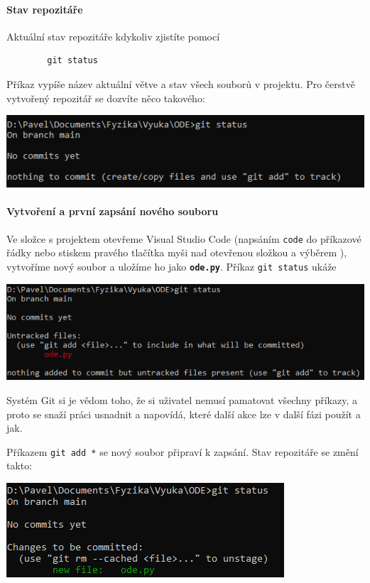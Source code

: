 \documentclass[a4paper,11pt,twoside]{article}
\newcommand{\subsubsubsection}[1]{\paragraph{#1}\mbox{}

}
\def\code#1{\textnormal{\texttt{#1}}}
\def\file#1{\textnormal{\textbf{\texttt{#1}}}}
\theoremstyle{red}
\theoremstyle{green}
\begin{document}
\subsubsubsection{Stav repozitáře}
    Aktuální stav repozitáře kdykoliv zjistíte pomocí
    \begin{lstlisting}
        git status\end{lstlisting}
    Příkaz vypíše název aktuální větve a stav všech souborů v projektu.
    Pro čerstvě vytvořený repozitář se dozvíte něco takového:
    \begin{center}\includegraphics[width=0.6\linewidth]{GitStatusEmpty.png}\end{center}

\subsubsubsection{Vytvoření a první zapsání nového souboru}
    Ve složce s projektem otevřeme Visual Studio Code (napsáním \code{code} do příkazové řádky nebo stiskem pravého tlačítka myši nad otevřenou složkou a výběrem ), vytvoříme nový soubor a uložíme ho jako \file{ode.py}.
    Příkaz \code{git status} ukáže
    \begin{center}\includegraphics[width=0.7\linewidth]{GitStatusFirst.png}\end{center}
    Systém Git si je vědom toho, že si uživatel nemusí pamatovat všechny příkazy, a proto se snaží práci usnadnit a napovídá, které další akce lze v další fázi použít a jak.

    Příkazem \code{git add *} se nový soubor připraví k zapsání.
    Stav repozitáře se změní takto:
    \begin{center}\includegraphics[width=0.45\linewidth]{GitStatusAdd.png}\end{center}
\end{document}
